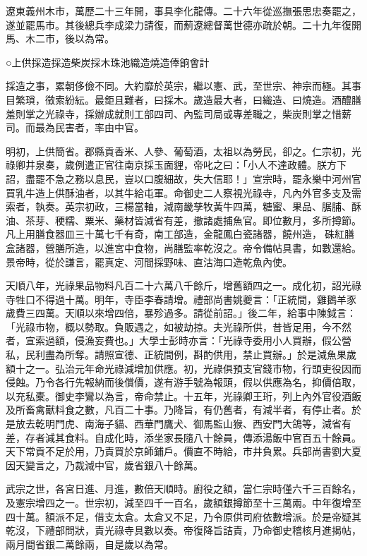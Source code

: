 遼東義州木市，萬歷二十三年開，事具李化龍傳。二十六年從巡撫張思忠奏罷之，遂並罷馬市。其後總兵李成梁力請復，而薊遼總督萬世德亦疏於朝。二十九年復開馬、木二市，後以為常。

○上供採造採造柴炭採木珠池織造燒造俸餉會計

採造之事，累朝侈儉不同。大約靡於英宗，繼以憲、武，至世宗、神宗而極。其事目繁瑣，徵索紛紜。最鉅且難者，曰採木。歲造最大者，曰織造、曰燒造。酒醴膳羞則掌之光祿寺，採辦成就則工部四司、內監司局或專差職之，柴炭則掌之惜薪司。而最為民害者，率由中官。

明初，上供簡省。郡縣貢香米、人參、葡萄酒，太祖以為勞民，卻之。仁宗初，光祿卿井泉奏，歲例遣正官往南京採玉面貍，帝叱之曰：「小人不達政體。朕方下詔，盡罷不急之務以息民，豈以口腹細故，失大信耶！」宣宗時，罷永樂中河州官買乳牛造上供酥油者，以其牛給屯軍。命御史二人察視光祿寺，凡內外官多支及需索者，執奏。英宗初政，三楊當軸，減南畿孳牧黃牛四萬，糖蜜、果品、腒脯、酥油、茶芽、稉糯、粟米、藥材皆減省有差，撤諸處捕魚官。即位數月，多所撙節。凡上用膳食器皿三十萬七千有奇，南工部造，金龍鳳白瓷諸器，饒州造，硃紅膳盒諸器，營膳所造，以進宮中食物，尚膳監率乾沒之。帝令備帖具書，如數還給。景帝時，從於謙言，罷真定、河間採野味、直沽海口造乾魚內使。

天順八年，光祿果品物料凡百二十六萬八千餘斤，增舊額四之一。成化初，詔光祿寺牲口不得過十萬。明年，寺臣李春請增。禮部尚書姚夔言：「正統間，雞鵝羊豕歲費三四萬。天順以來增四倍，暴殄過多。請從前詔。」後二年，給事中陳鉞言：「光祿市物，概以勢取。負販遇之，如被劫掠。夫光祿所供，昔皆足用，今不然者，宣索過額，侵漁妄費也。」大學士彭時亦言：「光祿寺委用小人買辦，假公營私，民利盡為所奪。請照宣德、正統間例，斟酌供用，禁止買辦。」於是減魚果歲額十之一。弘治元年命光祿減增加供應。初，光祿俱預支官錢市物，行頭吏役因而侵蝕。乃令各行先報納而後償價，遂有游手號為報頭，假以供應為名，抑價倍取，以充私橐。御史李鸞以為言，帝命禁止。十五年，光祿卿王珩，列上內外官役酒飯及所畜禽獸料食之數，凡百二十事。乃降旨，有仍舊者，有減半者，有停止者。於是放去乾明門虎、南海子貓、西華門鷹犬、御馬監山猴、西安門大鴿等，減省有差，存者減其食料。自成化時，添坐家長隨八十餘員，傳添湯飯中官百五十餘員。天下常貢不足於用，乃責買於京師鋪戶。價直不時給，市井負累。兵部尚書劉大夏因天變言之，乃裁減中官，歲省銀八十餘萬。

武宗之世，各宮日進、月進，數倍天順時。廚役之額，當仁宗時僅六千三百餘名，及憲宗增四之一。世宗初，減至四千一百名，歲額銀撙節至十三萬兩。中年復增至四十萬。額派不足，借支太倉。太倉又不足，乃令原供司府依數增派。於是帝疑其乾沒，下禮部問狀，責光祿寺具數以奏。帝復降旨詰責，乃命御史稽核月進揭帖，兩月間省銀二萬餘兩，自是歲以為常。

